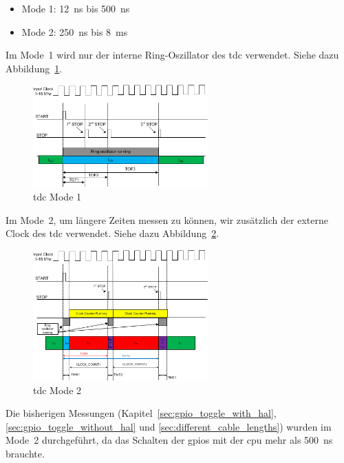 \begin{itemize}
    \item Mode 1: 12~ns bis 500~ns
    \item Mode 2: 250~ns bis 8~ms
\end{itemize}

Im Mode~1 wird nur der interne Ring-Oszillator des \acrshort{tdc} verwendet. Siehe dazu Abbildung~\ref{fig:tdc_mode1}.

\begin{figure}[H]
    \centering
    \includegraphics[width=0.6\textwidth]{graphics/tdc_mode1.png}
    \caption[\acrshort{tdc} Mode 1]{\acrshort{tdc} Mode 1 \cite{ti2016tdc7200_datasheet}}\label{fig:tdc_mode1}
\end{figure}

Im Mode~2, um längere Zeiten messen zu können, wir zusätzlich der externe Clock des \acrshort{tdc} verwendet. Siehe dazu
Abbildung~\ref{fig:tdc_mode2}.

\begin{figure}[H]
    \centering
    \includegraphics[width=0.6\textwidth]{graphics/tdc_mode2.png}
    \caption[\acrshort{tdc} Mode 2]{\acrshort{tdc} Mode 2 \cite{ti2016tdc7200_datasheet}}\label{fig:tdc_mode2}
\end{figure}

Die bisherigen Messungen (Kapitel~\ref{sec:gpio_toggle_with_hal}, \ref{sec:gpio_toggle_without_hal} und
\ref{sec:different_cable_lengths}) wurden im Mode~2 durchgeführt, da das Schalten der \acrshort{gpio}s mit der
\acrshort{cpu} mehr als 500~ns brauchte.

